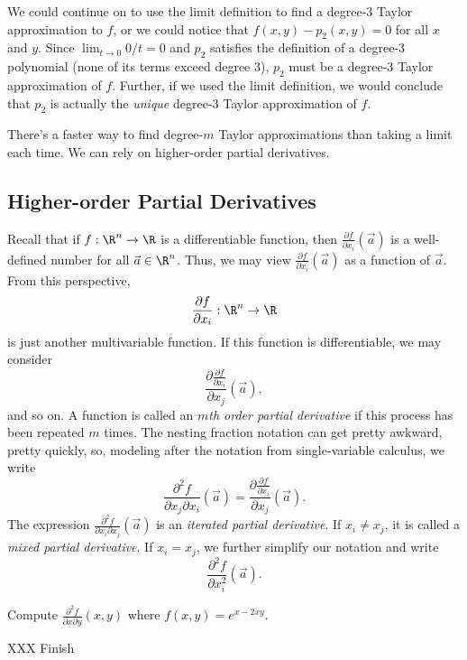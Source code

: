 \begin{example}
	We could continue on to use the limit definition to find a degree-$3$ Taylor
	approximation to $f$, or we could notice that $f(x,y)-p_2(x,y)=0$ for all $x$ and $y$.
	Since $\lim_{t\to0} 0/t=0$ and $p_2$ satisfies the definition of a degree-$3$ polynomial
	(none of its terms exceed degree $3$), $p_2$ must be a degree-$3$ Taylor approximation
	of $f$.  Further, if we used the limit definition, we would conclude that $p_2$ is
	actually the \emph{unique} degree-$3$ Taylor approximation of $f$.
\end{example}

There's a faster way to find degree-$m$ Taylor approximations
than taking a limit each time.  We can rely on higher-order 
partial derivatives.

\subsection{Higher-order Partial Derivatives}
Recall that if $f:\R^n\to\R$ is a differentiable function, then
$
	\frac{\partial f}{\partial x_i}(\vec a)
$
is a well-defined number for all $\vec a\in\R^n$.  
Thus, we may view $\frac{\partial f}{\partial x_i}(\vec a)$ as
a function of $\vec a$.  From this perspective, 
\[
	\frac{\partial f}{\partial x_i}:\R^n\to\R
\]
is just another multivariable function.  If this function is differentiable, we may consider
\[
	\frac{\partial \frac{\partial f}{\partial x_i}}{\partial x_j}(\vec a),
\]
and so on.  A function is called an \emph{$m$th order partial derivative}
if this process has been repeated $m$ times.
The nesting fraction notation can get pretty awkward, pretty quickly, so, modeling after
the notation from single-variable calculus, we write
\[
	\frac{\partial^2 f}{\partial x_j\partial x_i}(\vec a)=\frac{\partial \frac{\partial f}{\partial x_i}}{\partial x_j}(\vec a).
\]
The expression $\frac{\partial^2 f}{\partial x_i\partial x_j}(\vec a)$ is
an \emph{iterated partial derivative}.  If $x_i\neq x_j$, it is called
a \emph{mixed partial derivative}.  If
$x_i=x_j$, we further simplify our notation and write
\[
	\frac{\partial^2 f}{\partial x_i^2}(\vec a).
\]

\begin{example}
	Compute $\frac{\partial^2 f}{\partial x\partial y}(x,y)$ where $f(x,y)=e^{x-2xy}$.

	XXX Finish
\end{example}

